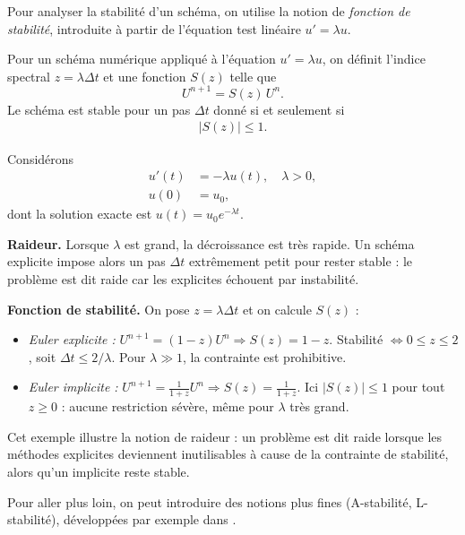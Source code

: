 Pour analyser la stabilité d’un schéma, on utilise la notion de \emph{fonction de stabilité}, introduite à partir de l’équation test linéaire $u'=\lambda u$.

\begin{definition}
Pour un schéma numérique appliqué à l’équation $u'=\lambda u$, on définit l’indice spectral $z=\lambda \Delta t$ et une fonction $S(z)$ telle que
\[
U^{n+1} = S(z)\,U^n.
\]
Le schéma est stable pour un pas $\Delta t$ donné si et seulement si
\begin{align}
    |S(z)| \leq 1.
\end{align}
\end{definition}

\begin{exemple}
Considérons
\begin{align}
    u'(t) &= -\lambda u(t), \quad \lambda>0, \\
    u(0) &= u_0,
\end{align}
dont la solution exacte est $u(t)=u_0 e^{-\lambda t}$.

\textbf{Raideur.}  
Lorsque $\lambda$ est grand, la décroissance est très rapide.  
Un schéma explicite impose alors un pas $\Delta t$ extrêmement petit pour rester stable : le problème est dit raide car les explicites échouent par instabilité.

\textbf{Fonction de stabilité.}  
On pose $z=\lambda \Delta t$ et on calcule $S(z)$ :
\begin{itemize}
    \item \emph{Euler explicite :} $U^{n+1}=(1-z)U^n \Rightarrow S(z)=1-z$.  
          Stabilité $\iff 0\leq z\leq 2$, soit $\Delta t \leq 2/\lambda$.  
          Pour $\lambda\gg 1$, la contrainte est prohibitive.
    \item \emph{Euler implicite :} $U^{n+1}=\tfrac{1}{1+z}U^n \Rightarrow S(z)=\tfrac{1}{1+z}$.  
          Ici $|S(z)|\leq 1$ pour tout $z\geq 0$ : aucune restriction sévère, même pour $\lambda$ très grand.
\end{itemize}

Cet exemple illustre la notion de raideur : un problème est dit raide lorsque les méthodes explicites deviennent inutilisables à cause de la contrainte de stabilité, alors qu’un implicite reste stable.
\end{exemple}

Pour aller plus loin, on peut introduire des notions plus fines (A-stabilité, L-stabilité), développées par exemple dans \cite{HairerAndWanner1}.


